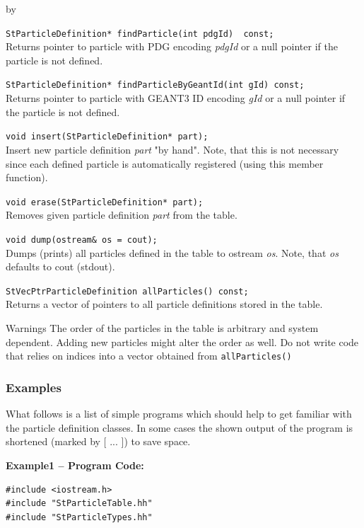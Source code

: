 \documentclass[twoside]{article}
\newcommand{\comp}[1]{\texttt{#1}}%
\newcommand{\args}[1]{\textit{#1}}%
\newcommand{\entrylabel}[1]{\mbox{\textbf{{#1}}}\hfil}%
\newenvironment{entry}
{\begin{list}{}%
    {\renewcommand{\makelabel}{\entrylabel}%
     \setlength{\labelwidth}{90pt}%
     \setlength{\leftmargin}{\labelwidth}
     \advance\leftmargin by \labelsep%
      }%
    }%
  {\end{list}}
\newcommand{\Entrylabel}[1]%
{\raisebox{0pt}[1ex][0pt]{\makebox[\labelwidth][l]%
    {\parbox[t]{\labelwidth}{\hspace{0pt}\textbf{{#1}}}}}}
\newenvironment{Entry}%
{\renewcommand{\entrylabel}{\Entrylabel}\begin{entry}}%
  {\end{entry}}
\begin{document}
\begin{description}
\begin{Entry}
    \verb+StParticleDefinition* findParticle(int pdgId)  const; +\\          
    Returns pointer to particle with PDG encoding \args{pdgId} or a null
    pointer if the particle is not defined.
    
    \verb+StParticleDefinition* findParticleByGeantId(int gId) const;+\\   
    Returns pointer to particle with GEANT3 ID encoding \args{gId} or a null
    pointer if the particle is not defined.
    
    \verb+void insert(StParticleDefinition* part);+\\
    Insert new particle definition \args{part} "by hand".
    Note, that this is not necessary
    since each defined particle is automatically registered
    (using this member function).
    
    \verb+void erase(StParticleDefinition* part);+\\
    Removes given particle definition \args{part} from the table.
    
    \verb+void dump(ostream& os = cout);+\\ 
    Dumps (prints) all particles defined in the table to ostream 
    \args{os}. Note, that \args{os} defaults to cout (stdout).
    
    \verb+StVecPtrParticleDefinition allParticles() const;+\\
    Returns a vector of pointers to all particle definitions stored
    in the table.

\item[Warnings]
    The order of the particles in the table is arbitrary and
    system dependent. Adding new particles might alter
    the order as well. Do not write code that relies on indices
    into a vector obtained from \comp{allParticles()}
\end{Entry}

\subsubsection{Examples}
\label{sec:pex}
What follows is a list of simple programs which should help to get familiar
with the particle definition classes. In some cases the shown
output of the program is shortened (marked by [ ... ]) to save space.

{\footnotesize
{\bf Example1 -- Program Code:}  
\begin{verbatim}
#include <iostream.h>
#include "StParticleTable.hh"
#include "StParticleTypes.hh"


\end{verbatim}}
\end{description}
\end{document}
